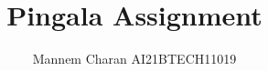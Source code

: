 \documentclass[journal,12pt,twocolumn]{IEEEtran}
\begin{document}
\let\StandardTheFigure\thefigure
\renewcommand{\thefigure}{\theproblem}



\def\putbox#1#2#3{\makebox[0in][l]{\makebox[#1][l]{}\raisebox{\baselineskip}[0in][0in]{\raisebox{#2}[0in][0in]{#3}}}}
     \def\rightbox#1{\makebox[0in][r]{#1}}
     \def\centbox#1{\makebox[0in]{#1}}
     \def\topbox#1{\raisebox{-\baselineskip}[0in][0in]{#1}}
     \def\midbox#1{\raisebox{-0.5\baselineskip}[0in][0in]{#1}}

\vspace{3cm}

\title{ Pingala Assignment
}


%
%
%

\author{ Mannem Charan AI21BTECH11019}
% 
%
\end{document}
